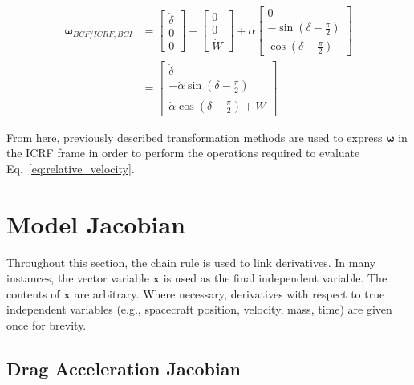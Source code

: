 \documentclass[]{article}
\newcommand{\vb}[1]{\bm{#1}} %
\begin{document}
\begin{align}
	\vb{\omega}_{BCF/ICRF, BCI} &= \left[ \begin{array}{c}
	\dot{\delta} \\
	0 \\
	0 \end{array} \right]
	+
	\left[ \begin{array}{c}
	0 \\
	0 \\
	\dot{W} \end{array} \right]
	+
	\dot{\alpha} \left[ \begin{array}{c}
	0 \\
	-\sin \left( \delta - \frac{\pi}{2} \right) \\
	\cos \left( \delta - \frac{\pi}{2} \right) \end{array} \right] \\
	\label{eq:omega}
	&=
	\left[ \begin{array}{c}
	\dot{\delta} \\
	- \dot{\alpha} \sin \left( \delta - \frac{\pi}{2} \right) \\
	\dot{\alpha} \cos \left( \delta - \frac{\pi}{2} \right) + \dot{W} \end{array} \right]
\end{align}

\noindent From here, previously described transformation methods are used to express $\vb{\omega}$ in the ICRF frame in order to perform the operations required to evaluate Eq.~\eqref{eq:relative_velocity}.


\section{Model Jacobian}
\label{sec:model_jacobian}

Throughout this section, the chain rule is used to link derivatives. In many instances, the vector variable $\vb{x}$ is used as the final independent variable. The contents of $\vb{x}$ are arbitrary. Where necessary, derivatives with respect to true independent variables (e.g., spacecraft position, velocity, mass, time) are given once for brevity. 

\subsection{Drag Acceleration Jacobian}
\label{sec:drag_acceleration_jacobian}
\end{document}
